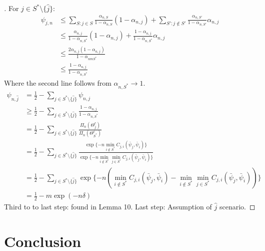   \begin{proof}[]
    For $j \in S^* \setminus \{\hat{j}\}$:
    \begin{align}
      \psi_{j, n} &\leq \sum_{S: j \in S} \frac{\alpha_{n, S}}{1 - \alpha_{n, S}}(1 - \alpha_{n, j})+ \sum_{S': j \notin S'} \frac{\alpha_{n, S'}}{{1 - \alpha_{n, S'}}}\alpha_{n, j} \\
      &\leq \frac{\alpha_{n, j}}{1 - \alpha_{n, S^*}}(1 - \alpha_{n, j}) + \frac{1 - \alpha_{n, j}}{1 - \alpha_{n, S^*}} \alpha_{n, j} \\
      &\leq \frac{2 \alpha_{n, j}(1 - \alpha_{n, j})}{1 - \alpha_{nm S^*}} \\
      &\leq \frac{1 - \alpha_{n, j}}{1 - \alpha_{n, S^*}}
    \end{align}
    Where the second line follows from $\alpha_{n, S^*} \rightarrow 1$.
    \begin{align}
      \psi_{n, \hat{j}} &= \frac{1}{2} - \sum_{j \in S^* \setminus \{\hat{j}\}} \psi_{n, j}\\
        &\geq \frac{1}{2} - \sum_{j \in S^* \setminus \{\hat{j}\}} \frac{1 - \alpha_{n, j}}{1 - \alpha_{n, S^*}} \\
        &= \frac{1}{2} - \sum_{j \in S^* \setminus \{\hat{j}\}} \frac{\Pi_n(\Theta_j^c)}{\Pi_n(\Theta_{S^*}^c)} \\
        &= \frac{1}{2} - \sum_{j \in S^* \setminus \{\hat{j}\}} \frac{\exp\{-n \min_{i \notin S^*} C_{j, i}(\bar{\psi}_j, \bar{\psi}_i) \}}{\exp\{-n \min_{i \notin S^*} \min_{j \in S^*} C_{j, i}(\bar{\psi}_j, \bar{\psi}_i) \}}\\
        &= \frac{1}{2} - \sum_{j \in S^* \setminus \{\hat{j}\}} \exp\{-n(\min_{i \notin S^*} C_{j, i}(\bar{\psi}_j, \bar{\psi}_i) - \min_{i \notin S^*} \min_{j \in S^*} C_{j, i}(\bar{\psi}_j, \bar{\psi}_i))\} \\
        &= \frac{1}{2} - m \exp(-n\delta)
    \end{align}
    Third to to last step: found in Lemma 10.
    Last step: Assumption of $\hat{j}$ scenario.
  \end{proof}

\chapter{Conclusion}
